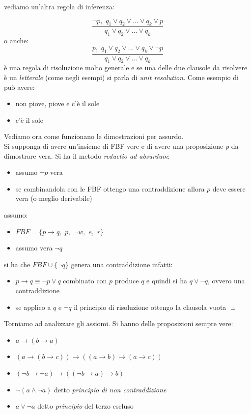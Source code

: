\documentclass[a4paper,12pt, oneside]{book}
\begin{document}
\newpage
vediamo un'altra regola di inferenza:
\begin{esempio}
	$$\frac{\neg p,\,\, q_1\vee q_2\vee ... \vee q_k \vee p}{q_1\vee q_2\vee ... \vee q_k}$$
	o anche:
	$$\frac{p,\,\, q_1\vee q_2\vee ... \vee q_k \vee \neg p}{q_1\vee q_2\vee ... \vee q_k}$$
	è una regola di risoluzione molto generale e se una delle due clausole da risolvere è un \textit{letterale} (come negli esempi) si parla di \textit{unit resolution}. Come esempio di può avere:
	\begin{itemize}
		\item non piove, piove e c'è il sole
		\item c'è il sole
	\end{itemize}
\end{esempio}
Vediamo ora come funzionano le dimostrazioni per assurdo.\\
Si supponga di avere un'insieme di FBF vere e di avere una proposizione \textit{p} da dimostrare vera. Si ha il metodo \textit{reductio ad absurdum}:
\begin{itemize}
	\item assumo $\neg p$ vera
	\item se combinandola con le FBF ottengo una contraddizione allora $p$ deve essere vera (o meglio derivabile)
\end{itemize}
\begin{esempio}
	assumo:
	\begin{itemize}
		\item $FBF=\{p\to q,\,\,p,\,\,\neg w,\,\,e,\,\,r\}$
		\item assumo vera $\neg q$
	\end{itemize}
	si ha che $FBF\cup \{\neg q\}$ genera una contraddizione infatti:
	\begin{itemize}
		\item $p\to q \equiv\neg p\vee q$ combinato con $p$ produce $q$ e quindi si ha $q\vee\neg q$, ovvero una contraddizione
		\item se applico a $q$ e $\neg q$ il principio di risoluzione ottengo la clausola vuota $\perp$
	\end{itemize}
\end{esempio}
Torniamo ad analizzare gli assiomi. Si hanno delle proposizioni sempre vere:
\begin{itemize}
	\item $a\to(b\to a)$
	\item $(a\to(b\to c))\to((a\to b)\to(a\to c))$
	\item $(\neg b\to \neg a)\to ((\neg b\to a)\to b)$
	\item $\neg(a\wedge \neg a)$ detto \textit{principio di non contraddizione}
	\item $a\vee \neg a$ detto \textit{principio} del terzo escluso
\end{itemize}
\end{document}
